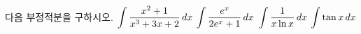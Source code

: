다음 부정적분을 구하시오.
 $\displaystyle\int\dfrac{x^2+1}{x^3+3x+2}\mkern3mu dx$
 $\displaystyle\int\dfrac{e^x}{2e^x+1}\mkern3mu dx$
 $\displaystyle\int\dfrac{1}{x\ln x}\mkern3mu dx$
 $\displaystyle\int\tan x\mkern3mu dx$
